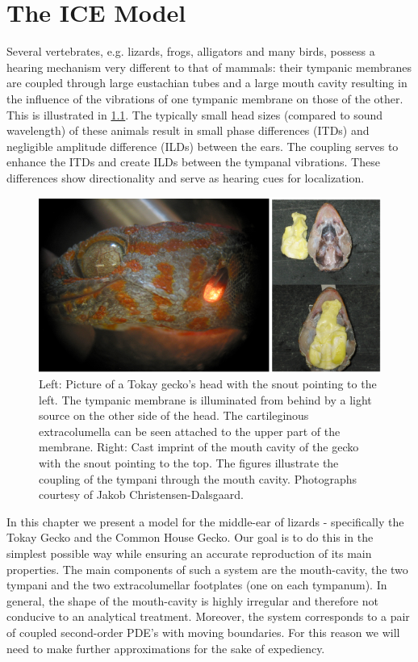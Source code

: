\chapter{The ICE Model}
Several vertebrates, e.g. lizards, frogs, alligators and many birds, possess a hearing mechanism very different to
that of mammals: their tympanic membranes are coupled through large eustachian tubes and a large mouth cavity resulting in the influence of the vibrations of one tympanic membrane
on those of the other. This is illustrated in \ref{geckohead}. The typically small head sizes (compared to sound wavelength) of these animals result in
small phase differences (ITDs) and negligible amplitude difference (ILDs) between the ears. The coupling serves to enhance the ITDs and create ILDs
between the tympanal vibrations. These differences show directionality and serve as hearing cues for localization.

\begin{figure}[ht!]
 \centering
 \includegraphics[width=.85\linewidth]{Diagrams/geckohead1.png}
 \caption[Illustration of a gecko's head]{Left: Picture of a Tokay gecko's head with the snout pointing to the left. The tympanic membrane is illuminated from behind by
 a light source on the other side of the head. The cartileginous extracolumella can be seen attached to the upper part of the membrane.
 Right: Cast imprint of the mouth cavity of the gecko with the snout pointing to the top. The figures illustrate the coupling of the tympani through the mouth cavity.
 Photographs courtesy of Jakob Christensen-Dalsgaard.}
  \label{geckohead}
\end{figure}

In this chapter we present a model for the
middle-ear of lizards - specifically the Tokay Gecko and the Common House Gecko. Our goal is to do this in the simplest possible way while ensuring an accurate reproduction of its main properties. 
The main components of such a 
system are the mouth-cavity, the two tympani and the two extracolumellar
footplates (one on each tympanum). In general, the shape of the mouth-cavity is highly irregular and therefore
not conducive to an analytical treatment. Moreover, the system corresponds to a pair of coupled second-order PDE's with
moving boundaries. For this reason we will need to make further approximations for the sake of expediency.

